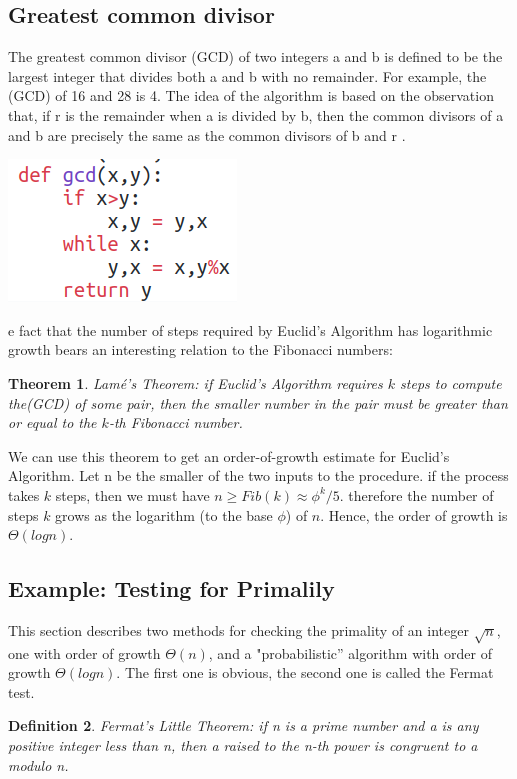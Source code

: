 \documentclass[a4paper,twoside]{article}
\newtheorem{theorem}{Theorem}[section]
\newtheorem{definition}[theorem]{Definition}
\numberwithin{equation}{section}
\begin{document}
\subsection{Greatest common divisor}
The greatest common divisor (GCD) of two integers a and b is defined to
be the largest integer that divides both a and b with no remainder. For
example, the (GCD) of 16 and 28 is 4.   The idea of the algorithm is based on the observation that,
if r is the remainder when a is divided by b, then the common divisors of a and b are precisely
the same as the common divisors of b and r .
\begin{center}
    \includegraphics[scale = 0.4]{assets/gcd.png}
\end{center}
e fact that the number of steps required by Euclid's Algorithm
has logarithmic growth bears an interesting relation to the Fibonacci
numbers:
\begin{theorem}
    Lamé's Theorem: if Euclid's Algorithm requires $k$ steps to
    compute the(GCD) of some pair, then the smaller number in
    the pair must be greater than or equal to the $k$-th Fibonacci
    number.
\end{theorem}
We can use this theorem to get an order-of-growth estimate for Euclid's
Algorithm. Let n be the smaller of the two inputs to the procedure.
if the process takes $k$ steps, then we must have $n \geq Fib(k) \approx \phi^k / 5$. therefore
the number of steps $k$ grows as the logarithm (to the base $\phi$) of $n$. Hence, the order of
growth is $\Theta(log n)$.

\subsection{Example: Testing for Primalily}
This section describes two methods for checking the primality of an integer $\sqrt{n}$, one with
order of growth $\Theta(n)$, and a "probabilistic” algorithm with order of growth $\Theta(log n)$.
The first one is obvious, the second one is called the Fermat test.

\begin{definition}
    Fermat's Little Theorem: if n is a prime number and a
    is any positive integer less than n, then a raised to the n-th
    power is congruent to a modulo n.
\end{definition}
\end{document}
